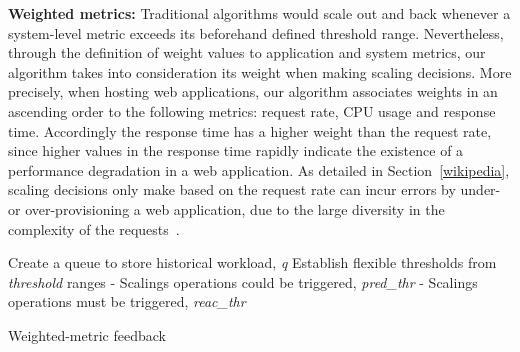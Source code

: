 \textbf{Weighted metrics:} Traditional algorithms would scale out and back whenever a system-level metric exceeds its beforehand defined threshold range. Nevertheless,  through the definition of weight values to application and system metrics, our algorithm takes into consideration its weight when making scaling decisions. More precisely, when hosting web applications, our algorithm associates weights in an ascending order to the following metrics: request rate, CPU usage and response time. Accordingly the response time has a higher weight than the request rate, since higher values in the response time rapidly indicate the existence of a performance degradation in a web application. As detailed in Section~\ref{wikipedia}, scaling decisions only make based on the request rate can incur errors by under- or over-provisioning  a web application, due to the large diversity in the complexity of the requests~\cite{singh_autonomic_2010}.



\begin{algorithm}
{\scriptsize
\SetAlgoLined
\SetInd{0mm}{2mm}
\BlankLine
Create a queue to store historical workload, \emph{q}\;
Establish flexible thresholds from \emph{threshold} ranges\;
\hspace{3mm}	- Scalings operations could be triggered, \emph{pred\_thr}\;
\hspace{3mm}	- Scalings operations must be triggered, \emph{reac\_thr}\; 
\BlankLine
{}
}
\caption{Weighted-metric feedback}
\label{history_prov}
\end{algorithm}


